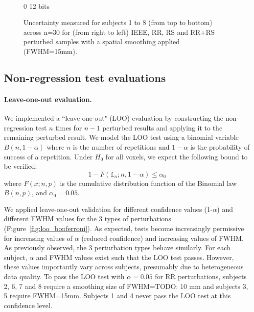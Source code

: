 \documentclass{article}
\newcommand{\TODO}[1]{\color{red}\textsc{TODO:} #1\color{black}\xspace}
\begin{document}
\begin{landscape}
\begin{figure}
\begin{subfigure}[t]{0.2\paperheight}
        \end{subfigure} \\
        \hspace*{6cm} 0  12 bits
        \caption{Uncertainty measured for subjects 1 to 8 (from top to bottom) across n=30 for
            (from right to left) IEEE, RR, RS and RR+RS perturbed samples with a spatial smoothing applied (FWHM=15mm). }
        \label{fig:uncertainty_maps}

    \end{figure}
\end{landscape}


\subsection{Non-regression test evaluations}

\paragraph{Leave-one-out evaluation.} We implemented a ``leave-one-out" (LOO)
evaluation by constructing the non-regression test $n$ times for $n-1$ perturbed results
and applying it to the remaining perturbed result. We model the LOO test
using a binomial variable $B(n,1-\alpha)$
where $n$ is the number of repetitions and $1-\alpha$ is
the probability of success of a repetition. Under $H_0$ for all voxels, we
expect the following
bound to be verified:
\[
    1-F(\mathds{1}_n;n,1-\alpha) \leq \alpha_0
\]
where $F(x;n,p)$ is the cumulative distribution function of the Binomial law $B(n,p)$, and
$\alpha_0=0.05$.

We applied leave-one-out validation for
different  confidence values (1-$\alpha$) and different FWHM  values for the
3 types of perturbations (Figure~\ref{fig:loo_bonferroni}). As expected, tests
become increasingly permissive for increasing values of $\alpha$ (reduced
confidence) and increasing values of FWHM. As previously observed, the 3 perturbation types
behave similarly. For each subject, $\alpha$ and FWHM values exist such that
the LOO test passes. However, these values importantly vary across subjects, presumably
due to heterogeneous data quality. To pass the LOO
test with $\alpha=0.05$ for RR perturbations,
subjects 2, 6, 7 and 8 require a smoothing size of FWHM=\TODO{10}mm and
subjects 3, 5 require FWHM=15mm. Subjects 1 and 4 never pass the LOO test
at this confidence level.
\end{document}
